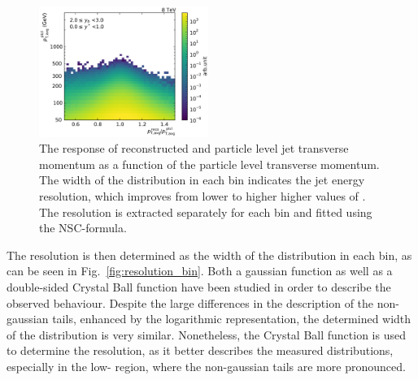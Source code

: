 \begin{figure}[htbp]
    \includegraphics[width=0.49\textwidth]{figures/measurement/gen_vs_reco_vs_gen_ptavg_yb2ys0.pdf}
    \caption[Comparison generated vs. reconstructed transverse energy]
            {The response of reconstructed and particle level jet transverse
                momentum as a function of the particle level transverse momentum.
                The width of the distribution in each \ptavg bin indicates the
                jet energy resolution, which improves from lower to higher higher values of \ptavg. The
                resolution is extracted separately for each bin and
                fitted using the NSC-formula.}
    \label{fig:gen_vs_reco_over_gen}
\end{figure}

The resolution is then determined as the width of the distribution in each \ptavg
bin, as can be seen in Fig.~\ref{fig:resolution_bin}. Both a gaussian function
as well as a double-sided Crystal Ball function have been studied in order to
describe the observed behaviour. Despite the large differences in the
description of the non-gaussian tails, enhanced by the logarithmic
representation, the determined width of the distribution is very similar.
Nonetheless, the Crystal Ball function is used to determine the resolution, as
it better describes the measured distributions, especially in the low-\pt
region, where the non-gaussian tails are more pronounced.

